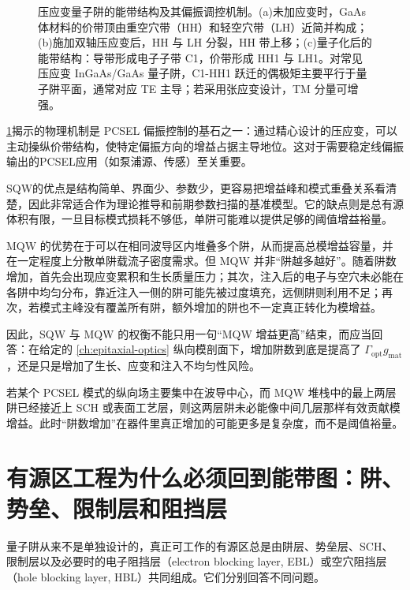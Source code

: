 \begin{figure}[htbp]
  \centering
  
  \caption{压应变量子阱的能带结构及其偏振调控机制。(a)未加应变时，GaAs 体材料的价带顶由重空穴带（HH）和轻空穴带（LH）近简并构成；(b)施加双轴压应变后，HH 与 LH 分裂，HH 带上移；(c)量子化后的能带结构：导带形成电子子带 C1，价带形成 HH1 与 LH1。对常见压应变 InGaAs/GaAs 量子阱，C1-HH1 跃迁的偶极矩主要平行于量子阱平面，通常对应 TE 主导；若采用张应变设计，TM 分量可增强\cite{coldren2012,ahn1995strained,nicholes2008strainedmqw}。}
  \label{fig:ch17_qw_band_diagram}
\end{figure}

\cref{fig:ch17_qw_band_diagram}揭示的物理机制是 PCSEL 偏振控制的基石之一：通过精心设计的压应变，可以主动操纵价带结构，使特定偏振方向的增益占据主导地位。这对于需要稳定线偏振输出的PCSEL应用（如泵浦源、传感）至关重要。

SQW的优点是结构简单、界面少、参数少，更容易把增益峰和模式重叠关系看清楚，因此非常适合作为理论推导和前期参数扫描的基准模型。它的缺点则是总有源体积有限，一旦目标模式损耗不够低，单阱可能难以提供足够的阈值增益裕量。

MQW 的优势在于可以在相同波导区内堆叠多个阱，从而提高总模增益容量，并在一定程度上分散单阱载流子密度需求。但 MQW 并非“阱越多越好”。随着阱数增加，首先会出现应变累积和生长质量压力；其次，注入后的电子与空穴未必能在各阱中均匀分布，靠近注入一侧的阱可能先被过度填充，远侧阱则利用不足；再次，若模式主峰没有覆盖所有阱，额外增加的阱也不一定真正转化为模增益。

因此，SQW 与 MQW 的权衡不能只用一句“MQW 增益更高”结束，而应当回答：在给定的 \cref{ch:epitaxial-optics} 纵向模剖面下，增加阱数到底是提高了 $\Gamma_{\mathrm{opt}}g_{\mathrm{mat}}$，还是只是增加了生长、应变和注入不均匀性风险。

\begin{ExampleBox}
若某个 PCSEL 模式的纵向场主要集中在波导中心，而 MQW 堆栈中的最上两层阱已经接近上 SCH 或表面工艺层，则这两层阱未必能像中间几层那样有效贡献模增益。此时“阱数增加”在器件里真正增加的可能更多是复杂度，而不是阈值裕量。
\end{ExampleBox}

\section{有源区工程为什么必须回到能带图：阱、势垒、限制层和阻挡层}
量子阱从来不是单独设计的，真正可工作的有源区总是由阱层、势垒层、SCH、限制层以及必要时的电子阻挡层（electron blocking layer, EBL）或空穴阻挡层（hole blocking layer, HBL）共同组成。它们分别回答不同问题。

